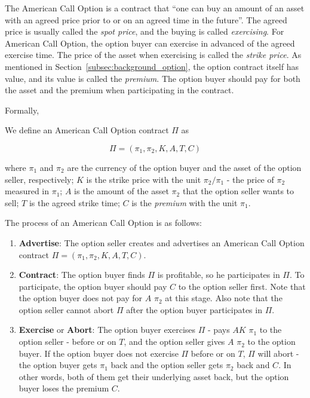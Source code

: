 The American Call Option is a contract that ``one can buy an amount of an asset with an agreed price prior to or on an agreed time in the future''. 
The agreed price is usually called the \textit{spot price}, and the buying is called \textit{exercising}.
For American Call Option, the option buyer can exercise in advanced of the agreed exercise time.
The price of the asset when exercising is called the \textit{strike price}.
As mentioned in Section~\ref{subsec:background_option}, the option contract itself has value, and its value is called the \textit{premium}.
The option buyer should pay for both the asset and the premium when participating in the contract.

Formally,

\begin{definition}
We define an American Call Option contract $\Pi$ as

$$\Pi = (\pi_1, \pi_2, K, A, T, C)$$

where
$\pi_1$ and $\pi_2$ are the currency of the option buyer and the asset of the option seller, respectively; 
$K$ is the strike price with the unit $\pi_2 / \pi_1$ - the price of $\pi_2$ measured in $\pi_1$;
$A$ is the amount of the asset $\pi_2$ that the option seller wants to sell;
$T$ is the agreed strike time;
$C$ is the \textit{premium} with the unit $\pi_1$.
\end{definition}

The process of an American Call Option is as follows:

\begin{enumerate}
    \item \textbf{Advertise}: The option seller creates and advertises an American Call Option contract $\Pi = (\pi_1, \pi_2, K, A, T, C)$.
    \item \textbf{Contract}: The option buyer finds $\Pi$ is profitable, so he participates in $\Pi$.
    To participate, the option buyer should pay $C$ to the option seller first.
    Note that the option buyer does not pay for $A$ $\pi_2$ at this stage.
    Also note that the option seller cannot abort $\Pi$ after the option buyer participates in $\Pi$.
    \item \textbf{Exercise} or \textbf{Abort}: The option buyer exercises $\Pi$ - pays $AK$ $\pi_1$ to the option seller - before or on $T$, and the option seller gives $A$ $\pi_2$ to the option buyer.
    If the option buyer does not exercise $\Pi$ before or on $T$, $\Pi$ will abort - the option buyer gets $\pi_1$ back and the option seller gets $\pi_2$ back and $C$. In other words, both of them get their underlying asset back, but the option buyer loses the premium $C$.
\end{enumerate}

